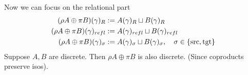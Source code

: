 \documentclass[12pt,a4paper]{article}
\begin{document}
Now we can focus on the relational part 
\begin{align*}
  (\rho A \oplus \pi B)(\gamma)_R &:= A(\gamma)_R \sqcup B(\gamma)_R\\
  (\rho A \oplus \pi B)(\gamma)_{refl} &:= A(\gamma)_{refl} \sqcup B(\gamma)_{refl}\\
  (\rho A \oplus \pi B)(\gamma)_{\sigma} &:= A(\gamma)_{\sigma} \sqcup B(\gamma)_{\sigma}, \quad \sigma \in \{\text{src}, \text{tgt}\}
\end{align*}
Suppose $A,B$ are discrete. Then $\rho A \oplus \pi B$ is also discrete.
(Since coproducts preserve isos).
\end{document}
